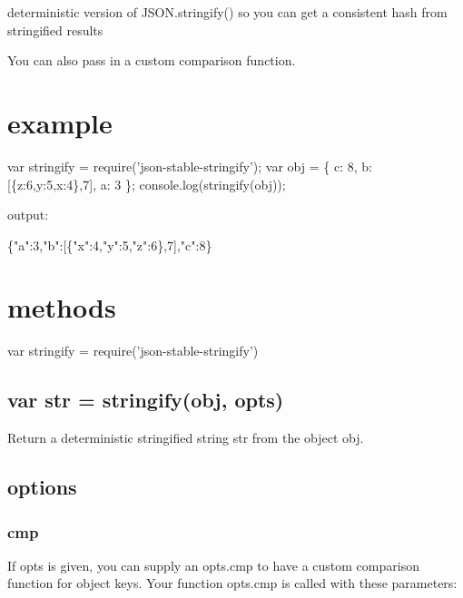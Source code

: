 deterministic version of {\ttfamily J\+S\+O\+N.\+stringify()} so you can get a consistent hash from stringified results

You can also pass in a custom comparison function.

\href{https://ci.testling.com/substack/json-stable-stringify}{\tt }

\href{http://travis-ci.org/substack/json-stable-stringify}{\tt }

\section*{example}


\begin{DoxyCode}
var stringify = require('json-stable-stringify');
var obj = \{ c: 8, b: [\{z:6,y:5,x:4\},7], a: 3 \};
console.log(stringify(obj));
\end{DoxyCode}


output\+:


\begin{DoxyCode}
\{"a":3,"b":[\{"x":4,"y":5,"z":6\},7],"c":8\}
\end{DoxyCode}


\section*{methods}


\begin{DoxyCode}
var stringify = require('json-stable-stringify')
\end{DoxyCode}


\subsection*{var str = stringify(obj, opts)}

Return a deterministic stringified string {\ttfamily str} from the object {\ttfamily obj}.

\subsection*{options}

\subsubsection*{cmp}

If {\ttfamily opts} is given, you can supply an {\ttfamily opts.\+cmp} to have a custom comparison function for object keys. Your function {\ttfamily opts.\+cmp} is called with these parameters\+:


